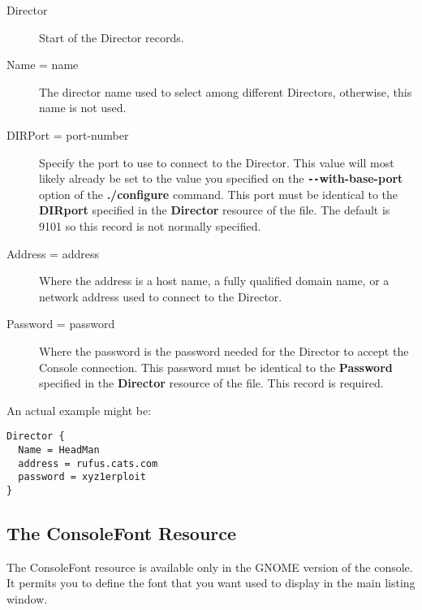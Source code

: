 \begin{description}

\item [Director]
   Start of the Director records. 

\item [Name = \lt{}name\gt{}]
   The director name used to select  among different Directors, otherwise, this
name is not used. 

\item [DIRPort = \lt{}port-number\gt{}]
   Specify the port to use to connect  to the Director. This value will most
likely already be set to the value  you specified on the {\bf
\verb{--{with-base-port} option of the  {\bf ./configure} command. This port must be
identical to the  {\bf DIRport} specified in the {\bf Director} resource of
the 
 file.  The
default is 9101 so this record is not normally specified. 

\item [Address = \lt{}address\gt{}]
   Where the address is a host name,  a fully qualified domain name, or a network
address used to connect  to the Director. 

\item [Password = \lt{}password\gt{}]
   Where the password is the  password needed for the Director to accept the
Console connection.  This password must be identical to the {\bf Password}
specified in  the {\bf Director} resource of the 
 file. This 
record is required. 
\end{description}

An actual example might be: 

\footnotesize
\begin{verbatim}
Director {
  Name = HeadMan
  address = rufus.cats.com
  password = xyz1erploit
}
\end{verbatim}
\normalsize

\subsection*{The ConsoleFont Resource}

The ConsoleFont resource is available only in the GNOME version of the
console. It permits you to define the font that you want used to display in
the main listing window. 

